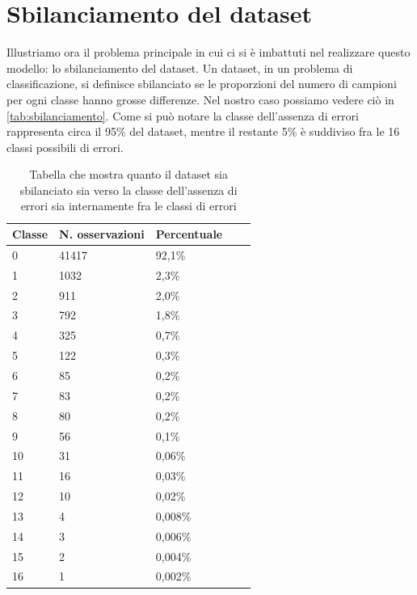 \section{Sbilanciamento del dataset}\label{sec:sbilanciamento}
Illustriamo ora il problema principale in cui ci si è imbattuti nel realizzare questo modello: lo sbilanciamento del dataset.
Un dataset, in un problema di classificazione, si definisce sbilanciato se le proporzioni del numero di campioni per ogni classe hanno grosse differenze.
Nel nostro caso possiamo vedere ciò in \autoref{tab:sbilanciamento}. 
Come si può notare la classe dell'assenza di errori rappresenta circa il 95\% del dataset, mentre il restante 5\% è suddiviso fra le 16 classi possibili di errori.
\begin{table}
    \centering
    \begin{tabular}[t]{lllll}
        \hline
        Classe & N. osservazioni & Percentuale &  &  \\
        \hline
        0      & 41417                  & 92,1\%                 &  &  \\
        1      & 1032                   & 2,3\%                  &  &  \\
        2      & 911                    & 2,0\%                  &  &  \\
        3      & 792                    & 1,8\%                  &  &  \\
        4      & 325                    & 0,7\%                  &  &  \\
        5      & 122                    & 0,3\%                  &  &  \\
        6      & 85                    & 0,2\%                  &  &  \\
        7      & 83                    & 0,2\%                  &  &  \\
        8      & 80                    & 0,2\%                  &  &  \\
        9      & 56                    & 0,1\%                  &  &  \\
        10      & 31                    & 0,06\%                  &  &  \\
        11      & 16                    & 0,03\%                  &  &  \\
        12      & 10                    & 0,02\%                  &  &  \\
        13      & 4                    & 0,008\%                  &  &  \\
        14      & 3                    & 0,006\%                  &  &  \\
        15      & 2                    & 0,004\%                  &  &  \\
        16      & 1                    & 0,002\%                  &  &  
    \end{tabular}
    \caption{Tabella che mostra quanto il dataset sia sbilanciato sia verso la classe dell'assenza di errori sia internamente fra le classi di errori}
    \label{tab:sbilanciamento}
\end{table}
